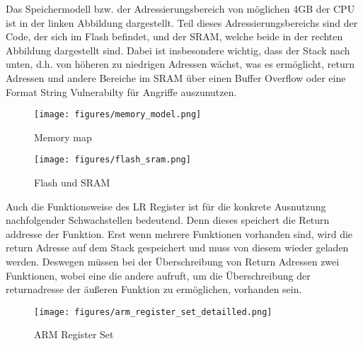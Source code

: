\documentclass[a4paper,
DIV=13,
12pt,
BCOR=10mm,
department=FakIM,
oneside,
parskip=half,
automark,
listof=totocnumbered,
bibliography=totocnumbered,
acronym=totocnumbered
] {OTHRartcl}
\begin{document}
Das Speichermodell bzw. der Adressierungsbereich von möglichen 4GB der CPU ist in der linken Abbildung dargestellt.
Teil dieses Adressierungsbereichs sind der Code, der sich im Flash befindet, und der SRAM, welche beide in der rechten Abbildung dargestellt sind.
Dabei ist insbesondere wichtig, dass der Stack nach unten, d.h. von höheren zu niedrigen Adressen wächst, was es ermöglicht,
return Adressen und andere Bereiche im SRAM über einen Buffer Overflow oder eine Format String Vulnerabilty für Angriffe auszunutzen.
\begin{figure}[ht!]
  \begin{minipage}[b]{.45\linewidth}
    \texttt{[image: figures/memory\_model.png]}
    \caption{Memory map}
    \label{Abbildung 1: Memory map}
  \end{minipage}
  \hspace{.1\linewidth}
  \begin{minipage}[b]{.48\linewidth}
    \texttt{[image: figures/flash\_sram.png]}
    \caption{Flash und SRAM}
    \label{Abbildung 6: Flash und SRAM}
  \end{minipage}
\end{figure}

Auch die Funktionsweise des LR Register ist für die konkrete Ausnutzung nachfolgender Schwachstellen bedeutend.
Denn dieses speichert die Return addresse der Funktion. Erst wenn mehrere Funktionen vorhanden sind, wird die return Adresse auf dem Stack gespeichert und muss von
diesem wieder geladen werden. Deswegen müssen bei der Überschreibung von Return Adressen zwei Funktionen, wobei eine die andere aufruft, um die Überschreibung
der returnadresse der äußeren Funktion zu ermöglichen, vorhanden sein.
\begin{figure}[ht!]
\begin{center}
  \texttt{[image: figures/arm\_register\_set\_detailled.png]}
  \caption{ARM Register Set}
  \label{Abbildung 1: ARM Register Set}
\end{center}
\end{figure}


\end{document}
